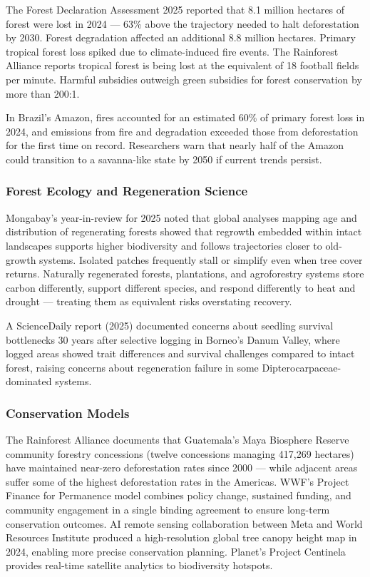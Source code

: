 \documentclass[11pt,letterpaper]{article}
\begin{document}
The Forest Declaration Assessment 2025 reported that 8.1 million hectares of forest were lost in 2024 --- 63\% above the trajectory needed to halt deforestation by 2030. Forest degradation affected an additional 8.8 million hectares. Primary tropical forest loss spiked due to climate-induced fire events. The Rainforest Alliance reports tropical forest is being lost at the equivalent of 18 football fields per minute. Harmful subsidies outweigh green subsidies for forest conservation by more than 200:1.

In Brazil's Amazon, fires accounted for an estimated 60\% of primary forest loss in 2024, and emissions from fire and degradation exceeded those from deforestation for the first time on record. Researchers warn that nearly half of the Amazon could transition to a savanna-like state by 2050 if current trends persist.

\subsubsection{Forest Ecology and Regeneration Science}

Mongabay's year-in-review for 2025 noted that global analyses mapping age and distribution of regenerating forests showed that regrowth embedded within intact landscapes supports higher biodiversity and follows trajectories closer to old-growth systems. Isolated patches frequently stall or simplify even when tree cover returns. Naturally regenerated forests, plantations, and agroforestry systems store carbon differently, support different species, and respond differently to heat and drought --- treating them as equivalent risks overstating recovery.

A ScienceDaily report (2025) documented concerns about seedling survival bottlenecks 30 years after selective logging in Borneo's Danum Valley, where logged areas showed trait differences and survival challenges compared to intact forest, raising concerns about regeneration failure in some Dipterocarpaceae-dominated systems.

\subsubsection{Conservation Models}

The Rainforest Alliance documents that Guatemala's Maya Biosphere Reserve community forestry concessions (twelve concessions managing 417,269 hectares) have maintained near-zero deforestation rates since 2000 --- while adjacent areas suffer some of the highest deforestation rates in the Americas. WWF's Project Finance for Permanence model combines policy change, sustained funding, and community engagement in a single binding agreement to ensure long-term conservation outcomes. AI remote sensing collaboration between Meta and World Resources Institute produced a high-resolution global tree canopy height map in 2024, enabling more precise conservation planning. Planet's Project Centinela provides real-time satellite analytics to biodiversity hotspots.
\end{document}
